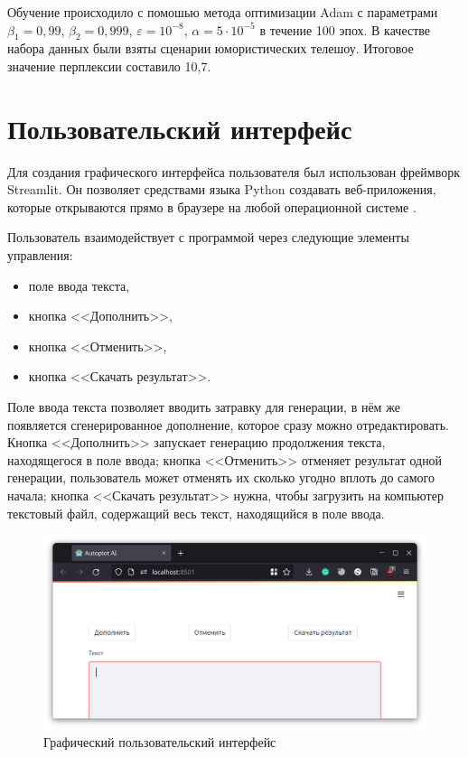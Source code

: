 Обучение происходило с помошью метода оптимизации Adam с параметрами $\beta_1=0,99$, $\beta_2=0,999$, $\varepsilon=10^{-8}$, $\alpha=5\cdot10^{-5}$ в течение 100 эпох. В качестве набора данных были взяты сценарии юмористических телешоу. Итоговое значение перплексии составило 10,7.

\section{Пользовательский интерфейс}

Для создания графического интерфейса пользователя был использован фреймворк Streamlit. Он позволяет средствами языка Python создавать веб-приложения, которые открываются прямо в браузере на любой операционной системе \cite{doc:streamlit}.

Пользователь взаимодействует с программой через следующие элементы управления:
\begin{itemize}
    \item поле ввода текста,
    \item кнопка <<Дополнить>>,
    \item кнопка <<Отменить>>,
    \item кнопка <<Скачать результат>>.
\end{itemize}

Поле ввода текста позволяет вводить затравку для генерации, в нём же появляется сгенерированное дополнение, которое сразу можно отредактировать. Кнопка <<Дополнить>> запускает генерацию продолжения текста, находящегося в поле ввода; кнопка <<Отменить>> отменяет результат одной генерации, пользователь может отменять их сколько угодно вплоть до самого начала; кнопка <<Скачать результат>> нужна, чтобы загрузить на компьютер текстовый файл, содержащий весь текст, находящийся в поле ввода.

\begin{figure}[H]
    \centering
    \includegraphics[width=\textwidth]{../inc/images/gui.png}
    \caption{Графический пользовательский интерфейс}
    \label{fig:gui}
\end{figure}

